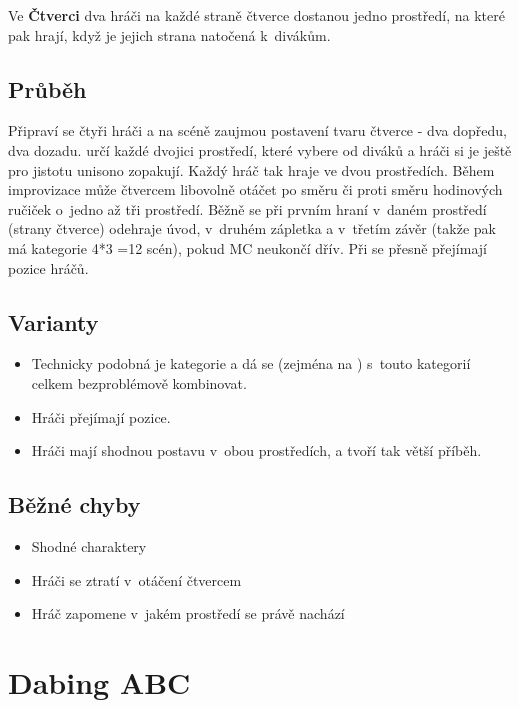 Ve \textbf{Čtverci} dva hráči na každé straně čtverce dostanou jedno prostředí, na které pak hrají, když je jejich strana natočená k~divákům. 
 
\subsection{Průběh} Připraví se čtyři hráči a na scéně zaujmou postavení tvaru čtverce - dva dopředu, dva dozadu.  určí každé dvojici prostředí, které vybere od diváků a hráči si je ještě pro jistotu unisono zopakují. Každý hráč tak hraje ve dvou prostředích. Během improvizace  může čtvercem libovolně otáčet po směru či proti směru hodinových ručiček o~jedno až tři prostředí. Běžně se při prvním hraní v~daném prostředí (strany čtverce) odehraje úvod, v~druhém zápletka a v~třetím závěr (takže pak má kategorie 4*3 =12 scén), pokud MC neukončí dřív. 
Při   se přesně přejímají pozice hráčů. 
 
\subsection{ Varianty} \begin{itemize}
\item Technicky podobná je kategorie  a dá se (zejména na ) s~touto kategorií celkem bezproblémově kombinovat.
\item Hráči přejímají pozice.
\item Hráči mají shodnou postavu v~obou prostředích, a tvoří tak větší příběh.
\end{itemize}
 
\subsection{Běžné chyby} \begin{itemize}
\item Shodné charaktery
\item Hráči se ztratí v~otáčení čtvercem
\item Hráč zapomene v~jakém prostředí se právě nachází
\end{itemize}
 
 
 
 
 
\needspace{5cm} \section{Dabing ABC} \label{dabing abc}  
 
